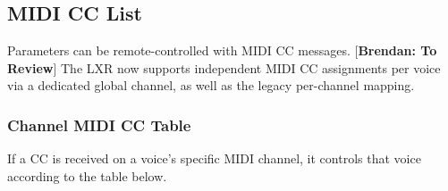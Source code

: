 \subsection{MIDI CC List}\label{midi-cc-list}

Parameters can be remote-controlled with MIDI CC messages.
{[}\textbf{Brendan: To Review}{]} The LXR now supports independent MIDI
CC assignments per voice via a dedicated global channel, as well as the
legacy per-channel mapping.

\subsubsection{Channel MIDI CC Table}\label{channel-midi-cc-table}

If a CC is received on a voice's specific MIDI channel, it controls that
voice according to the table below.

